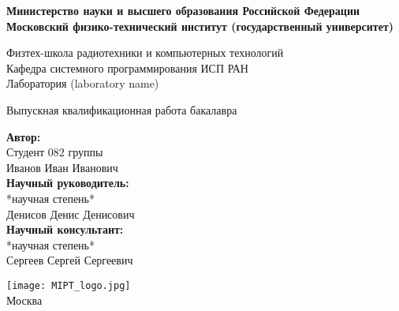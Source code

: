 \begin{center}
    \large\textbf{Министерство науки и высшего образования Российской Федерации\\
    Московский физико-технический институт (государственный
    университет)} \\
    \vspace{1cm}

    Физтех-школа радиотехники и компьютерных технологий \\

    Кафедра системного программирования ИСП РАН \\
    Лаборатория (laboratory name)\\

    \vspace{3em}

    Выпускная квалификационная работа бакалавра
\end{center}

\begin{center}
    \vspace{\fill}
    \LARGE{}

    \vspace{\fill}
\end{center}


\begin{flushright}
    \textbf{Автор:} \\
    Студент 082 группы \\
    Иванов Иван Иванович \\
    \vspace{2em}
    \textbf{Научный руководитель:} \\
    *научная степень* \\
    Денисов Денис Денисович \\
    \vspace{2em}
    \textbf{Научный консультант:} \\
    *научная степень* \\
    Сергеев Сергей Сергеевич \\
\end{flushright}

\vspace{7em}

\begin{center}
    \texttt{[image: MIPT\_logo.jpg]}\\
    Москва \the\year{}
\end{center}

\thispagestyle{empty}
